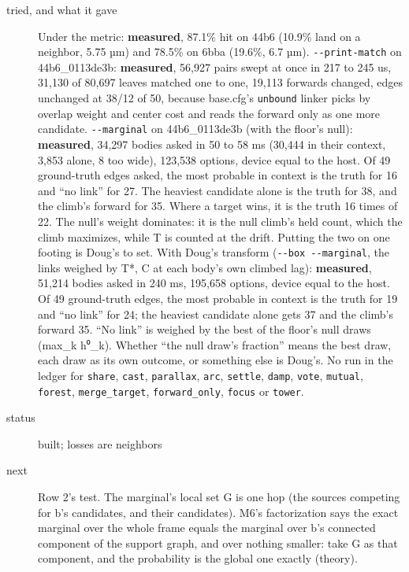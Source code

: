 \begin{description}
\item[{tried, and what it gave}] Under the metric: \textbf{measured}, 87.1\% hit on 44b6 (10.9\% land on a neighbor, 5.75 µm) and 78.5\% on 6bba (19.6\%, 6.7 µm). \texttt{-\allowbreak{}-\allowbreak{}print-\allowbreak{}match} on 44b6\_\allowbreak{}0113de3b: \textbf{measured}, 56,927 pairs swept at once in 217 to 245 us, 31,130 of 80,697 leaves matched one to one, 19,113 forwards changed, edges unchanged at 38/12 of 50, because base.cfg's \texttt{unbound} linker picks by overlap weight and center cost and reads the forward only as one more candidate. \texttt{-\allowbreak{}-\allowbreak{}marginal} on 44b6\_\allowbreak{}0113de3b (with the floor's null): \textbf{measured}, 34,297 bodies asked in 50 to 58 ms (30,444 in their context, 3,853 alone, 8 too wide), 123,538 options, device equal to the host. Of 49 ground-truth edges asked, the most probable in context is the truth for 16 and “no link” for 27. The heaviest candidate alone is the truth for 38, and the climb's forward for 35. Where a target wins, it is the truth 16 times of 22. The null's weight dominates: it is the null climb's held count, which the climb maximizes, while T is counted at the drift. Putting the two on one footing is Doug's to set. With Doug's transform (\texttt{-\allowbreak{}-\allowbreak{}box -\allowbreak{}-\allowbreak{}marginal}, the links weighed by T*, C at each body's own climbed lag): \textbf{measured}, 51,214 bodies asked in 240 ms, 195,658 options, device equal to the host. Of 49 ground-truth edges, the most probable in context is the truth for 19 and “no link” for 24; the heaviest candidate alone gets 37 and the climb's forward 35. “No link” is weighed by the best of the floor's null draws (max\_\allowbreak{}k h⁰\_\allowbreak{}k). Whether “the null draw's fraction” means the best draw, each draw as its own outcome, or something else is Doug's. No run in the ledger for \texttt{share}, \texttt{cast}, \texttt{parallax}, \texttt{arc}, \texttt{settle}, \texttt{damp}, \texttt{vote}, \texttt{mutual}, \texttt{forest}, \texttt{merge\_\allowbreak{}target}, \texttt{forward\_\allowbreak{}only}, \texttt{focus} or \texttt{tower}.
\item[{status}] built; losses are neighbors
\item[{next}] Row 2's test. The marginal's local set G is one hop (the sources competing for b's candidates, and their candidates). M6's factorization says the exact marginal over the whole frame equals the marginal over b's connected component of the support graph, and over nothing smaller: take G as that component, and the probability is the global one exactly (theory).
\end{description}

